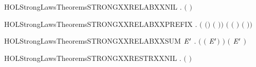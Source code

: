 \newcommand{\HOLStrongLawsTheoremsSTRONGXXRECXXACTTwo}{\UseVerbatim{HOLStrongLawsTheoremsSTRONGXXRECXXACTTwo}}
\begin{SaveVerbatim}{HOLStrongLawsTheoremsSTRONGXXRELABXXNIL}
\HOLTokenTurnstile{} \HOLSymConst{\HOLTokenForall{}}.  \ensuremath{(}  \ensuremath{)} 
\end{SaveVerbatim}
\newcommand{\HOLStrongLawsTheoremsSTRONGXXRELABXXNIL}{\UseVerbatim{HOLStrongLawsTheoremsSTRONGXXRELABXXNIL}}
\begin{SaveVerbatim}{HOLStrongLawsTheoremsSTRONGXXRELABXXPREFIX}
\HOLTokenTurnstile{} \HOLSymConst{\HOLTokenForall{}}  .
      \ensuremath{(} \ensuremath{(}\HOLSymConst{\ensuremath{\ldotp}}\ensuremath{)} \ensuremath{(} \ensuremath{)}\ensuremath{)}
       \ensuremath{(} \ensuremath{(} \ensuremath{)} \HOLSymConst{\ensuremath{\ldotp}}  \ensuremath{(} \ensuremath{)}\ensuremath{)}
\end{SaveVerbatim}
\newcommand{\HOLStrongLawsTheoremsSTRONGXXRELABXXPREFIX}{\UseVerbatim{HOLStrongLawsTheoremsSTRONGXXRELABXXPREFIX}}
\begin{SaveVerbatim}{HOLStrongLawsTheoremsSTRONGXXRELABXXSUM}
\HOLTokenTurnstile{} \HOLSymConst{\HOLTokenForall{}} \ensuremath{\HOLBoundVar{E}\sp{\prime{}}} .
      \ensuremath{(} \ensuremath{(} \HOLSymConst{\ensuremath{+}} \ensuremath{\HOLBoundVar{E}\sp{\prime{}}}\ensuremath{)} \ensuremath{)} \ensuremath{(}   \HOLSymConst{\ensuremath{+}}  \ensuremath{\HOLBoundVar{E}\sp{\prime{}}} \ensuremath{)}
\end{SaveVerbatim}
\newcommand{\HOLStrongLawsTheoremsSTRONGXXRELABXXSUM}{\UseVerbatim{HOLStrongLawsTheoremsSTRONGXXRELABXXSUM}}
\begin{SaveVerbatim}{HOLStrongLawsTheoremsSTRONGXXRESTRXXNIL}
\HOLTokenTurnstile{} \HOLSymConst{\HOLTokenForall{}}.  \ensuremath{(}  \ensuremath{)} 
\end{SaveVerbatim}
